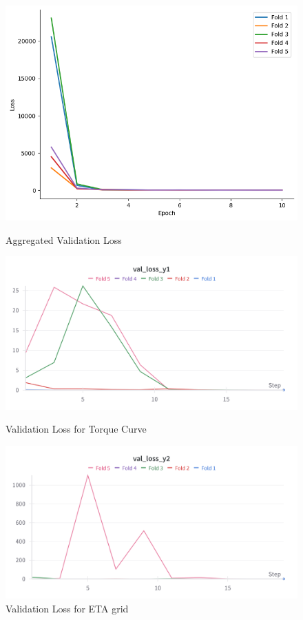\documentclass{report} %
\begin{document}
\begin{figure}[H]
    \centering
    \begin{minipage}[b]{0.3\textwidth}
        \includegraphics[width=\textwidth]{./ReportImages/val_loss.png}
        \caption{Aggregated Validation Loss}
        \label{fig:Aggregated Validation Loss}
    \end{minipage}
    \begin{minipage}[b]{0.3\textwidth}
        \includegraphics[width=\textwidth]{./ReportImages/val_loss_y1.png}
        \caption{Validation Loss for Torque Curve}
        \label{fig:Validation Loss for Torque Curve}
    \end{minipage}
    \hfill
    \begin{minipage}[b]{0.3\textwidth}
        \includegraphics[width=\textwidth]{./ReportImages/val_loss_y2.png}
        \caption{Validation Loss for ETA grid}
        \label{fig:Validation Loss for ETA grid}
    \end{minipage}
\end{figure}
\end{document}

